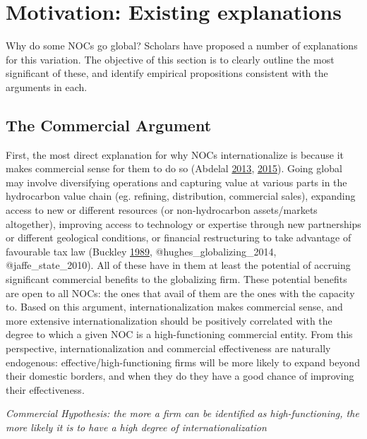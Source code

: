 \documentclass[11pt,]{book}
\begin{document}
\hypertarget{motiv02}{%
\section{Motivation: Existing explanations}\label{motiv02}}

Why do some NOCs go global? Scholars have proposed a number of explanations for this variation. The objective of this section is to clearly outline the most significant of these, and identify empirical propositions consistent with the arguments in each.

\hypertarget{the-commercial-argument}{%
\subsection{The Commercial Argument}\label{the-commercial-argument}}

First, the most direct explanation for why NOCs internationalize is because it makes commercial sense for them to do so (Abdelal \protect\hyperlink{ref-abdelal_profits_2013}{2013}, \protect\hyperlink{ref-abdelal_multinational_2015}{2015}). Going global may involve diversifying operations and capturing value at various parts in the hydrocarbon value chain (eg. refining, distribution, commercial sales), expanding access to new or different resources (or non-hydrocarbon assets/markets altogether), improving access to technology or expertise through new partnerships or different geological conditions, or financial restructuring to take advantage of favourable tax law (Buckley \protect\hyperlink{ref-buckley_foreign_1989}{1989}, @hughes\_globalizing\_2014, @jaffe\_state\_2010). All of these have in them at least the potential of accruing significant commercial benefits to the globalizing firm. These potential benefits are open to all NOCs: the ones that avail of them are the ones with the capacity to. Based on this argument, internationalization makes commercial sense, and more extensive internationalization should be positively correlated with the degree to which a given NOC is a high-functioning commercial entity. From this perspective, internationalization and commercial effectiveness are naturally endogenous: effective/high-functioning firms will be more likely to expand beyond their domestic borders, and when they do they have a good chance of improving their effectiveness.

\emph{Commercial Hypothesis: the more a firm can be identified as high-functioning, the more likely it is to have a high degree of internationalization}
\end{document}
